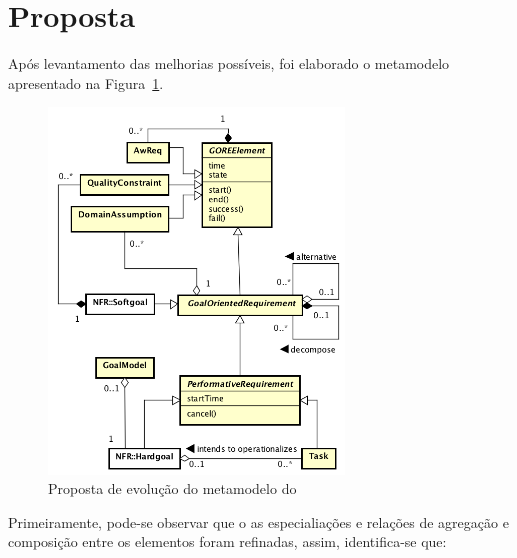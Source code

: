 \section{Proposta}
\label{sec-zanshin-proposta}

Após levantamento das melhorias possíveis, foi elaborado o metamodelo apresentado na Figura~\ref{figura-metamodelo-novo}. 

\begin{figure}[h]
	\centering
	\includegraphics[width=0.7\textwidth]{figuras/metamodelos/metamodelo-zanshin-novo.png}
	\caption{Proposta de evolução do metamodelo do \framework \zanshin}
	\label{figura-metamodelo-novo}
\end{figure}

Primeiramente, pode-se observar que o as especialiações e relações de agregação e composição entre os elementos foram refinadas, assim, identifica-se que:

